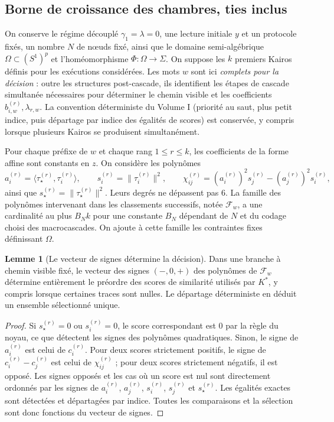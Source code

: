 \documentclass[11pt,a4paper]{article}
\theoremstyle{definition}
\newtheorem{lemma}[definition]{Lemme}
\theoremstyle{remark}
\begin{document}
\subsection{Borne de croissance des chambres, ties inclus}

On conserve le régime découplé $\gamma_1=\lambda=0$, une lecture initiale $y$ et un protocole fixés, un nombre $N$ de nœuds fixé, ainsi que le domaine semi-algébrique $\Omega\subset(S^1)^p$ et l'homéomorphisme $\Phi:\Omega\to\Sigma$. On suppose les $k$ premiers Kairos définis pour les exécutions considérées. Les mots $w$ sont ici \emph{complets pour la décision} : outre les structures post-cascade, ils identifient les étapes de cascade simultanée nécessaires pour déterminer le chemin visible et les coefficients $b_{i,w}^{(r)},\lambda_{r,w}$. La convention déterministe du Volume I (priorité au saut, plus petit indice, puis départage par indice des égalités de scores) est conservée, y compris lorsque plusieurs Kairos se produisent simultanément.

Pour chaque préfixe de $w$ et chaque rang $1\le r\le k$, les coefficients de la forme affine sont constants en $z$. On considère les polynômes
\[
 a_i^{(r)}=\langle\tau_\star^{(r)},\tau_i^{(r)}\rangle,\qquad
 s_i^{(r)}=\|\tau_i^{(r)}\|^2,\qquad
 \chi_{ij}^{(r)}=(a_i^{(r)})^2s_j^{(r)}-(a_j^{(r)})^2s_i^{(r)},
\]
ainsi que $s_\star^{(r)}=\|\tau_\star^{(r)}\|^2$. Leurs degrés ne dépassent pas $6$. La famille des polynômes intervenant dans les classements successifs, notée $\mathscr F_w$, a une cardinalité au plus $B_N k$ pour une constante $B_N$ dépendant de $N$ et du codage choisi des macrocascades. On ajoute à cette famille les contraintes fixes définissant $\Omega$.

\begin{lemma}[Le vecteur de signes détermine la décision]
\label{lem:signes-determinent-kstar}
Dans une branche à chemin visible fixé, le vecteur des signes $(-,0,+)$ des polynômes de $\mathscr F_w$ détermine entièrement le préordre des scores de similarité utilisés par $K^*$, y compris lorsque certaines traces sont nulles. Le départage déterministe en déduit un ensemble sélectionné unique.
\end{lemma}
\begin{proof}
Si $s_\star^{(r)}=0$ ou $s_i^{(r)}=0$, le score correspondant est $0$ par la règle du noyau, ce que détectent les signes des polynômes quadratiques. Sinon, le signe de $a_i^{(r)}$ est celui de $c_i^{(r)}$. Pour deux scores strictement positifs, le signe de $c_i^{(r)}-c_j^{(r)}$ est celui de $\chi_{ij}^{(r)}$ ; pour deux scores strictement négatifs, il est opposé. Les signes opposés et les cas où un score est nul sont directement ordonnés par les signes de $a_i^{(r)}$, $a_j^{(r)}$, $s_i^{(r)}$, $s_j^{(r)}$ et $s_\star^{(r)}$. Les égalités exactes sont détectées et départagées par indice. Toutes les comparaisons et la sélection sont donc fonctions du vecteur de signes.
\end{proof}
\end{document}
